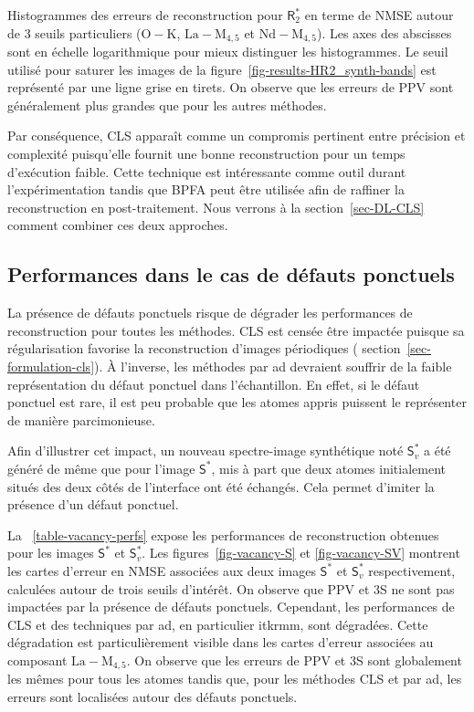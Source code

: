 \begin{normalfigure*}
    \caption{Histogrammes des erreurs de reconstruction pour $\mathsf{R}_2^*$ en terme de NMSE autour de 3 seuils particuliers ($\mathrm{O-K}$, $\mathrm{La-M}_{4, 5}$ et $\mathrm{Nd-M}_{4, 5}$). Les axes des abscisses sont en échelle logarithmique pour mieux distinguer les histogrammes. Le seuil utilisé pour saturer les images de la figure~\protect\ref{fig-results-HR2_synth-bands} est représenté par une ligne grise en tirets. On observe que les erreurs de PPV sont généralement plus grandes que pour les autres méthodes.
        \protect\label{fig-qu1-21-histograms}}    
\end{normalfigure*}


Par conséquence, CLS apparaît comme un compromis pertinent entre précision et complexité puisqu'elle fournit une bonne reconstruction pour un temps d'exécution faible. Cette technique est intéressante comme outil durant l'expérimentation tandis que BPFA peut être utilisée afin de raffiner la reconstruction en post-traitement. Nous verrons à la section~\ref{sec-DL-CLS} comment combiner ces deux approches.



\subsection{Performances dans le cas de défauts ponctuels}

La présence de défauts ponctuels risque de dégrader les performances de reconstruction pour toutes les méthodes. CLS est censée être impactée puisque sa régularisation favorise la reconstruction d'images périodiques (\cf{} section~\ref{sec-formulation-cls}). \`A l'inverse, les méthodes par \gls{ad} devraient souffrir de la faible  représentation du défaut ponctuel dans l'échantillon. En effet, si le défaut ponctuel est rare, il est peu probable que les atomes appris puissent le représenter de manière parcimonieuse.

Afin d'illustrer cet impact, un nouveau spectre-image synthétique noté $\mathsf{S}_v^*$ a été généré de même que pour l'image $\mathsf{S}^*$, mis à part que deux atomes initialement situés des deux côtés de l'interface ont été échangés. Cela permet d'imiter la présence d'un défaut ponctuel.

La \tabname~\ref{table-vacancy-perfs} expose les performances de reconstruction obtenues pour les images $\mathsf{S}^*$ et $\mathsf{S}_v^*$. Les figures~\ref{fig-vacancy-S} et \ref{fig-vacancy-SV} montrent les cartes d'erreur en NMSE associées aux deux images $\mathsf{S}^*$ et $\mathsf{S}_v^*$ respectivement, calculées autour de trois seuils d'intérêt. On observe que PPV et 3S ne sont pas impactées par la présence de défauts ponctuels. Cependant, les performances de CLS et des techniques par \gls{ad}, en particulier \gls{itkrmm}, sont dégradées. Cette dégradation est particulièrement visible dans les cartes d'erreur associées au composant $\mathrm{La-M}_{4, 5}$. On observe que les erreurs de PPV et 3S sont globalement les mêmes  pour tous les atomes tandis que, pour les méthodes CLS et par \gls{ad}, les erreurs sont localisées autour des défauts ponctuels.

